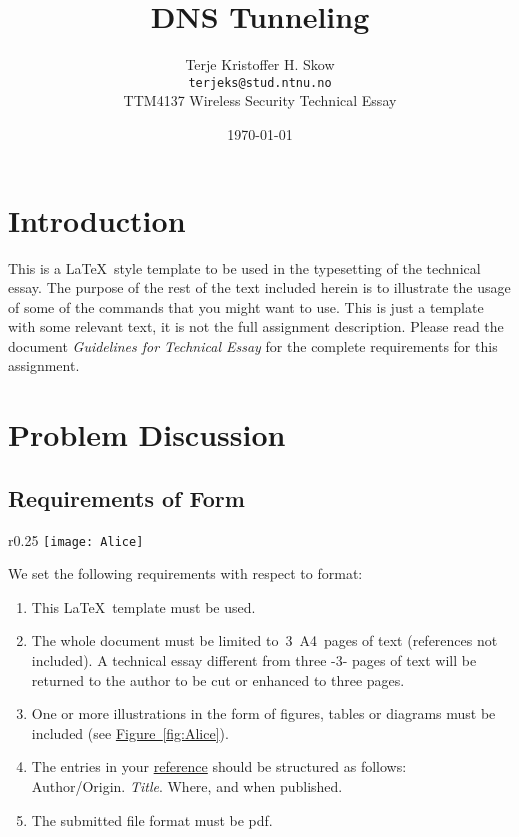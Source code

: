 \documentclass[a4paper,11pt]{article}
\title{DNS Tunneling}
\author{Terje Kristoffer H. Skow \\
	\texttt{terjeks@stud.ntnu.no}\\
	TTM4137 Wireless Security Technical Essay}
\date{\today}
\begin{document}
\maketitle

\section{Introduction}
This is a \LaTeX\ style template to be used in the typesetting of the technical essay.
The purpose of the rest of the text included herein is to illustrate the usage of some of the commands that you might want to use.
This is just a template with some relevant text, it is not the full assignment description.
Please read the document \emph{Guidelines for Technical Essay} for the complete requirements for this assignment.


\section{Problem Discussion}

\subsection{Requirements of Form}

\begin{wrapfigure}[10]{r}{0.25\textwidth}
  \centering
  \texttt{[image: Alice]} %
  \vspace{-0.2cm}
  \caption{A ``wrapped'' figure with the text.}
  \label{fig:Alice}
\end{wrapfigure}

We set the following requirements with respect to format:
\begin{enumerate}
	\item This \LaTeX\ template must be used.
	\item The whole document must be limited to~3~A4~pages of text (references not included).  A technical essay different from three -3- pages of text will be returned to the author
to be cut or enhanced to three pages.
	\item One or more illustrations in the form of figures, tables or diagrams must be included (see \hyperref[fig:Alice]{Figure~\ref*{fig:Alice}}).
	\item The entries in your \hyperref[sec:references]{reference} should be structured as follows:\\
	Author/Origin. \textit{Title}. Where, and when published.
	\item The submitted file format must be pdf.
\end{enumerate}
\end{document}
